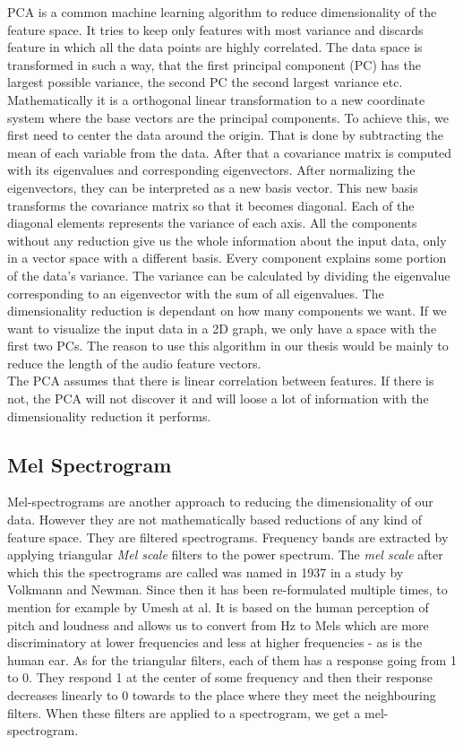 PCA is a common machine learning algorithm to reduce dimensionality of the feature space. It tries to keep only features with most variance and discards feature in which all the data points are highly correlated. The data space is transformed in such a way, that the first principal component (PC) has the largest possible variance, the second PC the second largest variance etc. \\
Mathematically it is a orthogonal linear transformation to a new coordinate system where the base vectors are the principal components. To achieve this, we first need to center the data around the origin. That is done by subtracting the mean of each variable from the data. After that a covariance matrix is computed with its eigenvalues and corresponding eigenvectors. After normalizing the eigenvectors, they can be interpreted as a new basis vector. This new basis transforms the covariance matrix so that it becomes diagonal. Each of the diagonal elements represents the variance of each axis. All the components without any reduction give us the whole information about the input data, only in a vector space with a different basis. Every component explains some portion of the data's variance. The variance can be calculated by dividing the eigenvalue corresponding to an eigenvector with the sum of all eigenvalues. The dimensionality reduction is dependant on how many components we want. If we want to visualize the input data in a 2D graph, we only have a space with the first two PCs. The reason to use this algorithm in our thesis would be mainly to reduce the length of the audio feature vectors. \\
The PCA assumes that there is linear correlation between features. If there is not, the PCA will not discover it and will loose a lot of information with the dimensionality reduction it performs.

\subsection{Mel Spectrogram}\label{ssec:mel_spectrograms_intro}
Mel-spectrograms are another approach to reducing the dimensionality of our data. However they are not mathematically based reductions of any kind of feature space. They are filtered spectrograms. Frequency bands are extracted by applying triangular \textit{Mel scale} filters to the power spectrum. The \textit{mel scale} after which this the spectrograms are called was named in 1937 in a study \cite{1937ASAJ....8..185S} by Volkmann and Newman. Since then it has been re-formulated multiple times, to mention for example \cite{mel_scale_fit} by Umesh at al. It is based on the human perception of pitch and loudness and allows us to convert from Hz to Mels which are more discriminatory at lower frequencies and less at higher frequencies - as is the human ear. As for the triangular filters, each of them has a response going from 1 to 0. They respond 1 at the center of some frequency and then their response decreases linearly to 0 towards to the place where they meet the neighbouring filters. When these filters are applied to a spectrogram, we get a mel-spectrogram.

